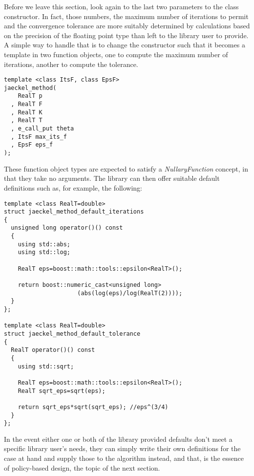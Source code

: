 \documentclass[a4paper,twoside,twocolumn]{article}
\begin{document}
Before we leave this section, look again to the last two parameters to
the class constructor. In fact, those numbers, the maximum number of
iterations to permit and the convergence tolerance are more suitably
determined by calculations based on the precision of the floating
point type than left to the library user to provide. A simple way to
handle that is to change the constructor such that it becomes a
template in two function objects, one to compute the maximum number of
iterations, another to compute the tolerance.
\begin{verbatim}
template <class ItsF, class EpsF>
jaeckel_method(
    RealT p
  , RealT F
  , RealT K
  , RealT T
  , e_call_put theta
  , ItsF max_its_f
  , EpsF eps_f
);
\end{verbatim}
These function object types are expected to satisfy a
\emph{NullaryFunction} concept, in that they take no arguments. The
library can then offer suitable default definitions such as, for
example, the following:
\begin{verbatim}
template <class RealT=double>
struct jaeckel_method_default_iterations
{
  unsigned long operator()() const
  {
    using std::abs;
    using std::log;

    RealT eps=boost::math::tools::epsilon<RealT>();
    
    return boost::numeric_cast<unsigned long>
                     (abs(log(eps)/log(RealT(2))));
  }
};

template <class RealT=double>
struct jaeckel_method_default_tolerance
{
  RealT operator()() const
  {
    using std::sqrt;

    RealT eps=boost::math::tools::epsilon<RealT>();
    RealT sqrt_eps=sqrt(eps);
 
    return sqrt_eps*sqrt(sqrt_eps); //eps^(3/4)
  }
};
\end{verbatim}
In the event either one or both of the library provided defaults don't
meet a specific library user's needs, they can simply write their own
definitions for the case at hand and supply those to the algorithm
instead, and that, is the essence of policy-based design, the topic of
the next section.
\end{document}
